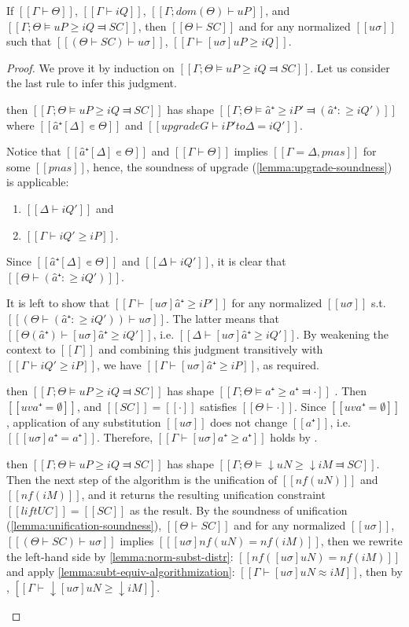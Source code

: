 \begin{lemma} \label{lemma:pos-subt-soundness}
    If $[[Γ ⊢ Θ]]$, $[[Γ ⊢ iQ]]$, $[[Γ ; dom(Θ) ⊢  uP]]$, and 
    $[[Γ ; Θ ⊨ uP ≥ iQ ⫤ SC]]$,
    then $[[Θ ⊢ SC]]$ and
    for any normalized $[[uσ]]$ such that $[[(Θ  ⊢  SC) ⊢ uσ]]$,
    $[[ Γ ⊢ [uσ]uP ≥ iQ ]]$.
\end{lemma}
\begin{proof} 
    We prove it by induction on $[[Γ ; Θ ⊨ uP ≥ iQ ⫤ SC]]$. 
    Let us consider the last rule to infer this judgment.
    \begin{caseof}
    \item {} then
    $[[Γ ; Θ ⊨ uP ≥ iQ ⫤ SC]]$ has shape $[[Γ;Θ ⊨ â⁺ ≥ iP' ⫤ (â⁺ :≥ iQ')]]$ where
    $[[â⁺[Δ] ∊ Θ]]$ and $[[upgrade G ⊢ iP' to Δ = iQ']]$.

    Notice that $[[â⁺[Δ] ∊ Θ]]$ and $[[Γ ⊢ Θ]]$ 
    implies $[[Γ = Δ, pnas]]$ for some $[[pnas]]$, hence, the
    soundness of upgrade (\cref{lemma:upgrade-soundness}) is applicable:
    \begin{enumerate}
        \item $[[Δ ⊢ iQ']]$ and
        \item $[[Γ ⊢ iQ' ≥ iP]]$.
    \end{enumerate}

    Since $[[â⁺[Δ] ∊ Θ]]$ and $[[Δ ⊢ iQ']]$, 
    it is clear that $[[ Θ ⊢ (â⁺ :≥ iQ') ]]$.

    It is left to show that $[[Γ ⊢ [uσ]â⁺ ≥ iP']]$ for any normalized $[[uσ]]$ 
    s.t. $[[(Θ  ⊢  (â⁺ :≥ iQ')) ⊢ uσ]]$.
    The latter means that $[[ Θ(â⁺) ⊢ [uσ]â⁺ ≥ iQ' ]]$, i.e. $[[Δ ⊢ [uσ]â⁺ ≥ iQ']]$. 
    By weakening the context to $[[Γ]]$ and combining this judgment
    transitively with $[[Γ ⊢ iQ' ≥ iP]]$, we have $[[Γ ⊢ [uσ]â⁺ ≥ iP]]$,
    as required. 

    \item \label{case:pos-subt-soundness:var}   
    then $[[Γ ; Θ ⊨ uP ≥ iQ ⫤ SC]]$ has shape $[[Γ;Θ ⊨ a⁺ ≥ a⁺ ⫤ ·]]$ .
    Then $[[uv a⁺ = ∅]]$, and $[[SC]] = [[·]]$ satisfies $[[Θ ⊢ ·]]$.
    Since $[[uv a⁺ = ∅]]$, application of any substitution $[[uσ]]$ 
     does not change $[[a⁺]]$, i.e. $[[ [uσ] a⁺ = a⁺]]$.
      Therefore, $[[Γ ⊢ [uσ]a⁺ ≥ a⁺]]$ holds by .

    \item \label{case:pos-subt-soundness:shift} 
      then
    $[[Γ ; Θ ⊨ uP ≥ iQ ⫤ SC]]$ has shape $[[Γ;Θ ⊨ ↓uN ≥ ↓iM ⫤ SC]]$.\\
    Then the next step of the algorithm is the unification of $[[nf(uN)]]$ and $[[nf(iM)]]$,
    and it returns the resulting unification constraint $[[lift UC]] = [[SC]]$ as the result.
    By the soundness of unification (\cref{lemma:unification-soundness}),
    $[[Θ ⊢ SC]]$ and for any normalized $[[uσ]]$, $[[(Θ  ⊢  SC) ⊢ uσ]]$
    implies $[[ [uσ]nf(uN) = nf(iM) ]]$, 
    then we rewrite the left-hand side by \cref{lemma:norm-subst-distr}:
    $[[ nf([uσ]uN) = nf(iM) ]]$ and apply \cref{lemma:subt-equiv-algorithmization}:
    $[[Γ ⊢ [uσ]uN ≈ iM]]$, then by ,
    $[[Γ ⊢ ↓[uσ]uN ≥ ↓iM]]$.
    

\end{caseof}
\end{proof}
